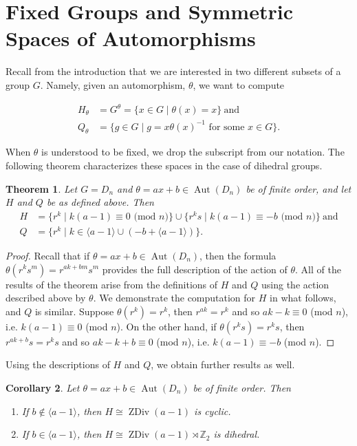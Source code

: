 \documentclass[12pt]{amsart}
\numberwithin{equation}{section}
\newtheorem{theorem}{Theorem}[section]
\newtheorem{cor}[theorem]{Corollary}
\theoremstyle{definition}
\newcommand{\Aut}{\operatorname{Aut}}
\newcommand{\Z}{\mathbb{Z}}
\newcommand{\zdiv}[1]{{\operatorname{ZDiv}(#1)}}
\renewcommand{\Z}{\mathbb{Z}}
\begin{document}
\section{Fixed Groups and Symmetric Spaces of Automorphisms}
\label{sec:results-aut}

Recall from the introduction that we are
interested in two different subsets of a group $G$. Namely, given an
automorphism, $\theta$, we want to compute

$$
\begin{aligned}
H_\theta&=G^\theta=\{x\in G\mid \theta(x)=x\}\ \mbox{and}\\
Q_\theta&=\{g\in G\mid g=x\theta(x)^{-1} \mbox{ for some } x\in G\}.
\end{aligned}$$

When $\theta$ is understood to be fixed, we drop the subscript from
our notation. The following theorem characterizes these spaces in the
case of dihedral groups.

\begin{theorem}
\label{thm:hqr}
Let $G=D_n$ and $\theta=ax+b\in\Aut(D_n)$ be of finite order, and let
$H$ and $Q$ be as defined above. Then
$$
\begin{aligned}
H&=\{r^k\mid k(a-1)\equiv 0 \mbox{ (mod $n$)}\}\cup \{r^ks\mid k(a-1)\equiv -b \mbox{ (mod $n$)}\}\ \mbox{and}\\
Q&=\{r^k\mid k\in\langle a-1\rangle\cup(-b+\langle a-1\rangle)\}.
\end{aligned}
$$
\end{theorem}

\begin{proof}
  Recall that if $\theta=ax+b\in\Aut(D_n)$, then the formula
  $\theta(r^ks^m)=r^{ak+bm}s^m$ provides the full description of the
  action of $\theta$. All of the results of the theorem arise from the
  definitions of $H$ and $Q$ using the action described above by
  $\theta$. We demonstrate the computation for $H$ in what
  follows, and $Q$ is similar. Suppose $\theta(r^k)=r^k$, then $r^{ak}=r^k$ and so
  $ak-k\equiv 0$ (mod $n$), i.e. $k(a-1)\equiv 0$ (mod $n$). On the
  other hand, if $\theta(r^ks)=r^ks$, then $r^{ak+b}s=r^ks$ and so
  $ak-k+b\equiv 0$ (mod $n$), i.e. $k(a-1)\equiv -b$ (mod $n$).
\end{proof}

Using the descriptions of $H$ and $Q$, we obtain further results as well.

\begin{cor}
\label{h-structure}
Let $\theta=ax+b\in\Aut(D_n)$ be of finite order. Then
\begin{enumerate}
\item
If $b\not\in\langle a-1\rangle$, then $H\cong\zdiv{a-1}$ is cyclic.
\item
If $b\in\langle a-1\rangle$, then $H\cong\zdiv{a-1} \rtimes \Z_2$ is dihedral.
\end{enumerate}
\end{cor}
\end{document}
